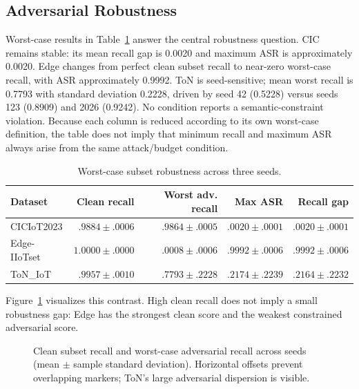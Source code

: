 \documentclass[runningheads]{llncs}
\begin{document}
\subsection{Adversarial Robustness}
Worst-case results in Table~\ref{tab:worst} answer the central robustness question. CIC remains stable: its mean recall gap is 0.0020 and maximum ASR is approximately 0.0020. Edge changes from perfect clean subset recall to near-zero worst-case recall, with ASR approximately 0.9992. ToN is seed-sensitive; mean worst recall is 0.7793 with standard deviation 0.2228, driven by seed 42 (0.5228) versus seeds 123 (0.8909) and 2026 (0.9242). No condition reports a semantic-constraint violation. Because each column is reduced according to its own worst-case definition, the table does not imply that minimum recall and maximum ASR always arise from the same attack/budget condition.

\begin{table}[t]
\caption{Worst-case subset robustness across three seeds.}
\label{tab:worst}
\centering
\begin{tabular}{lrrrr}
\toprule
Dataset & Clean recall & Worst adv. recall & Max ASR & Recall gap\\
\midrule
CICIoT2023 & $.9884\pm.0006$ & $.9864\pm.0005$ & $.0020\pm.0001$ & $.0020\pm.0001$\\
Edge-IIoTset & $1.0000\pm.0000$ & $.0008\pm.0006$ & $.9992\pm.0006$ & $.9992\pm.0006$\\
ToN\_IoT & $.9957\pm.0010$ & $.7793\pm.2228$ & $.2174\pm.2239$ & $.2164\pm.2232$\\
\bottomrule
\end{tabular}
\end{table}

Figure~\ref{fig:gap} visualizes this contrast. High clean recall does not imply a small robustness gap: Edge has the strongest clean score and the weakest constrained adversarial score.

\begin{figure}[t]
\centering
{}
\caption{Clean subset recall and worst-case adversarial recall across seeds (mean $\pm$ sample standard deviation). Horizontal offsets prevent overlapping markers; ToN's large adversarial dispersion is visible.}
\label{fig:gap}
\end{figure}
\end{document}
